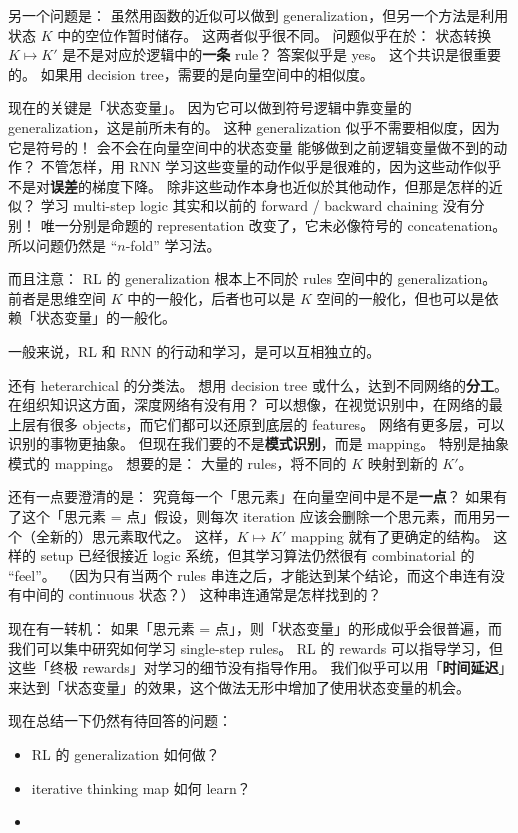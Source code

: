\documentclass[orivec]{llncs}
\newcommand{\emp}[1]{\textbf{#1}}
\begin{document}
另一个问题是： 虽然用函数的近似可以做到 generalization，但另一个方法是利用状态 $K$ 中的空位作暂时储存。 这两者似乎很不同。  问题似乎在於： 状态转换 $K \mapsto K'$ 是不是对应於逻辑中的\emp{一条} rule？  答案似乎是 yes。  这个共识是很重要的。  如果用 decision tree，需要的是向量空间中的相似度。

现在的关键是「状态变量」。  因为它可以做到符号逻辑中靠变量的 generalization，这是前所未有的。  这种 generalization 似乎不需要相似度，因为它是符号的！  会不会在向量空间中的状态变量 能够做到之前逻辑变量做不到的动作？  不管怎样，用 RNN 学习这些变量的动作似乎是很难的，因为这些动作似乎不是对\emp{误差}的梯度下降。  除非这些动作本身也近似於其他动作，但那是怎样的近似？  学习 multi-step logic 其实和以前的 forward / backward chaining 没有分别！  唯一分别是命题的 representation 改变了，它未必像符号的 concatenation。  所以问题仍然是 ``$n$-fold'' 学习法。 

而且注意： RL 的 generalization 根本上不同於 rules 空间中的 generalization。 前者是思维空间 $K$ 中的一般化，后者也可以是 $K$ 空间的一般化，但也可以是依赖「状态变量」的一般化。

一般来说，RL 和 RNN 的行动和学习，是可以互相独立的。  

还有 heterarchical 的分类法。  想用 decision tree 或什么，达到不同网络的\emp{分工}。  在组织知识这方面，深度网络有没有用？  可以想像，在视觉识别中，在网络的最上层有很多 objects，而它们都可以还原到底层的 features。  网络有更多层，可以识别的事物更抽象。  但现在我们要的不是\emp{模式识别}，而是 mapping。 特别是抽象模式的 mapping。  想要的是： 大量的 rules，将不同的 $K$ 映射到新的 $K'$。

还有一点要澄清的是： 究竟每一个「思元素」在向量空间中是不是\emp{一点}？  如果有了这个「思元素 = 点」假设，则每次 iteration 应该会删除一个思元素，而用另一个（全新的）思元素取代之。  这样，$K \mapsto K'$ mapping 就有了更确定的结构。  这样的 setup 已经很接近 logic 系统，但其学习算法仍然很有 combinatorial 的 ``feel''。 （因为只有当两个 rules 串连之后，才能达到某个结论，而这个串连有没有中间的 continuous 状态？）  这种串连通常是怎样找到的？  

现在有一转机： 如果「思元素 = 点」，则「状态变量」的形成似乎会很普遍，而我们可以集中研究如何学习 single-step rules。 RL 的 rewards 可以指导学习，但这些「终极 rewards」对学习的细节没有指导作用。  我们似乎可以用「\emp{时间延迟}」来达到「状态变量」的效果，这个做法无形中增加了使用状态变量的机会。  

现在总结一下仍然有待回答的问题：
\begin{itemize}
\item RL 的 generalization 如何做？
\item iterative thinking map 如何 learn？
\item 
\end{itemize}
\end{document}
